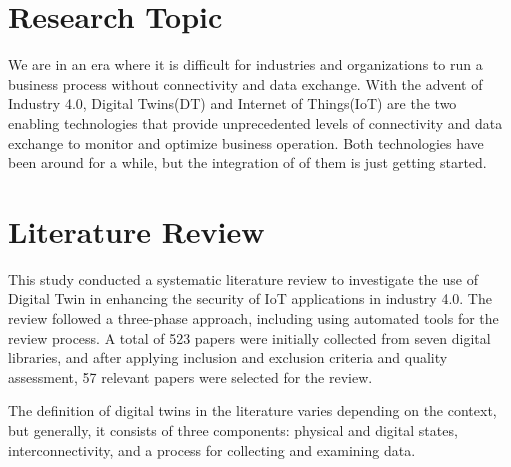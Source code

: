 

\section{Research Topic}We are in an era where it is difficult for industries and organizations to run a business process without connectivity and data exchange. With the advent of Industry 4.0, Digital Twins(DT) and Internet of Things(IoT) are the two enabling technologies that provide unprecedented levels of connectivity and data exchange to monitor and optimize business operation. Both technologies have been around for a while, but the integration of of them is just getting started.

\section{Literature Review}
This study conducted a systematic literature review to investigate the use of Digital Twin in enhancing the security of IoT applications in industry 4.0. The review followed a three-phase approach, including using automated tools for the review process. A total of 523 papers were initially collected from seven digital libraries, and after applying inclusion and exclusion criteria and quality assessment, 57 relevant papers were selected for the review. 

The definition of digital twins in the literature varies depending on the context, but generally, it consists of three components: physical and digital states, interconnectivity, and a process for collecting and examining data.

